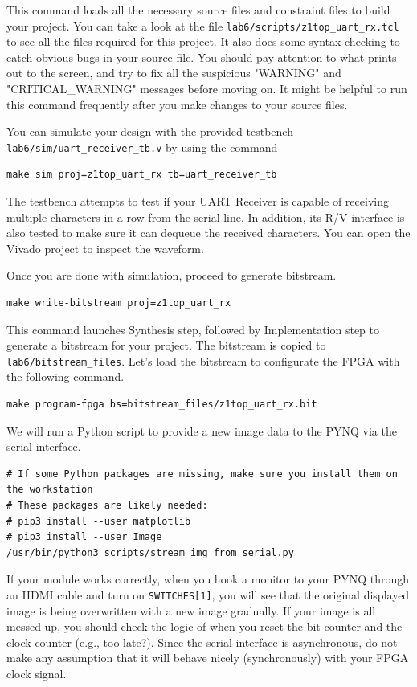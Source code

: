 \documentclass[11pt]{article}
\begin{document}
This command loads all the necessary source files and constraint files to build your project. You can take a look at the file \verb|lab6/scripts/z1top_uart_rx.tcl| to see all the files required for this project. It also does some syntax checking to catch obvious bugs in your source file. You should pay attention to what prints out to the screen, and try to fix all the suspicious "WARNING" and "CRITICAL\_WARNING" messages before moving on. It might be helpful to run this command frequently after you make changes to your source files.

You can simulate your design with the provided testbench \verb|lab6/sim/uart_receiver_tb.v| by using the command

\begin{verbatim}
make sim proj=z1top_uart_rx tb=uart_receiver_tb
\end{verbatim}

The testbench attempts to test if your UART Receiver is capable of receiving multiple characters in a row from the serial line. In addition, its R/V interface is also tested to make sure it can dequeue the received characters. You can open the Vivado project to inspect the waveform.

Once you are done with simulation, proceed to generate bitstream.

\begin{verbatim}
make write-bitstream proj=z1top_uart_rx
\end{verbatim}

This command launches Synthesis step, followed by Implementation step to generate a bitstream for your project. The bitstream is copied to \verb|lab6/bitstream_files|. Let's load the bitstream to configurate the FPGA with the following command.

\begin{verbatim}
make program-fpga bs=bitstream_files/z1top_uart_rx.bit
\end{verbatim}

We will run a Python script to provide a new image data to the PYNQ via the serial interface.

\begin{verbatim}
# If some Python packages are missing, make sure you install them on the workstation
# These packages are likely needed:
# pip3 install --user matplotlib
# pip3 install --user Image
/usr/bin/python3 scripts/stream_img_from_serial.py
\end{verbatim}

If your module works correctly, when you hook a monitor to your PYNQ through an HDMI cable and turn on \verb|SWITCHES[1]|, you will see that the original displayed image is being overwritten with a new image gradually. If your image is all messed up, you should check the logic of when you reset the bit counter and the clock counter (e.g., too late?). Since the serial interface is asynchronous, do not make any assumption that it will behave nicely (synchronously) with your FPGA clock signal.
\end{document}
